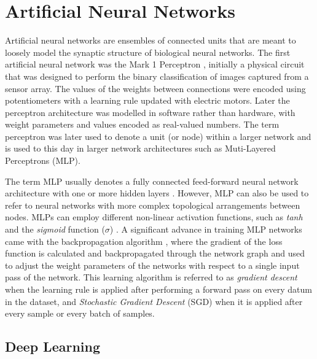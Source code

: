 \section{Artificial Neural Networks}
\label{c2:subsec:neural-networks}

Artificial neural networks are ensembles of connected units that are meant to loosely model the synaptic structure of biological neural networks. 
The first artificial neural network was the Mark 1 Perceptron \citep{rosenblatt1958perceptron}, initially a physical circuit that was designed to perform the binary classification of images captured from a sensor array. 
The values of the weights between connections were encoded using potentiometers with a learning rule updated with electric motors. 
Later the perceptron architecture was modelled in software rather than hardware, with weight parameters and values encoded as real-valued numbers. 
The term perceptron was later used to denote a unit (or node) within a larger network and is used to this day in larger network architectures such as Muti-Layered Perceptrons (MLP).

The term MLP usually denotes a fully connected feed-forward neural network architecture with one or more hidden layers \citep{rosenblatt1958perceptron}. 
However, MLP can also be used to refer to neural networks with more complex topological arrangements between nodes. 
MLPs can employ different non-linear activation functions, such as \textit{tanh} \citep{kalman1992tanh} and the \textit{sigmoid} function ($\sigma$) \citep{han1995influence}.
A significant advance in training MLP networks came with the backpropagation algorithm \citep{werbos1974beyond}, where the gradient of the loss function is calculated and backpropagated through the network graph and used to adjust the weight parameters of the networks with respect to a single input pass of the network. 
This learning algorithm is referred to as \textit{gradient descent} when the learning rule is applied after performing a forward pass on every datum in the dataset, and \textit{Stochastic Gradient Descent} (SGD) when it is applied after every sample or every batch of samples. 

\subsection{Deep Learning}

